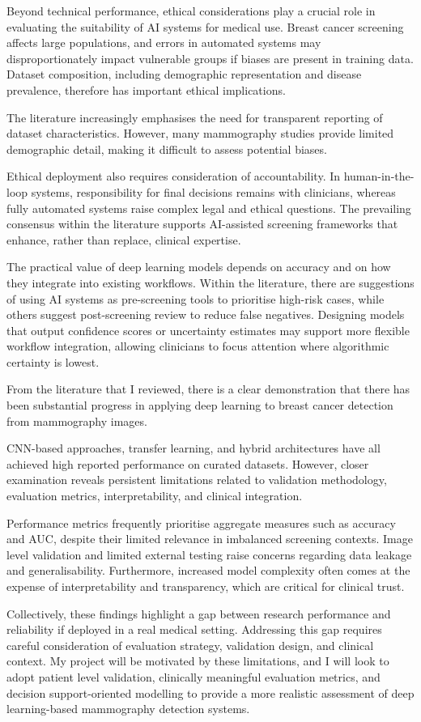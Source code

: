 Beyond technical performance, ethical considerations play a crucial role in evaluating the suitability of AI systems for medical use. Breast cancer screening affects large populations, and errors in automated systems may disproportionately impact vulnerable groups if biases are present in training data. Dataset composition, including demographic representation and disease prevalence, therefore has important ethical implications.

The literature increasingly emphasises the need for transparent reporting of dataset characteristics. However, many mammography studies provide limited demographic detail, making it difficult to assess potential biases.

Ethical deployment also requires consideration of accountability. In human-in-the-loop systems, responsibility for final decisions remains with clinicians, whereas fully automated systems raise complex legal and ethical questions. The prevailing consensus within the literature supports AI-assisted screening frameworks that enhance, rather than replace, clinical expertise.

The practical value of deep learning models depends on accuracy and on how they integrate into existing workflows. Within the literature, there are suggestions of using AI systems as pre-screening tools to prioritise high-risk cases, while others suggest post-screening review to reduce false negatives. Designing models that output confidence scores or uncertainty estimates may support more flexible workflow integration, allowing clinicians to focus attention where algorithmic certainty is lowest.

From the literature that I reviewed, there is a clear demonstration that there has been substantial progress in applying deep learning to breast cancer detection from mammography images. 

CNN-based approaches, transfer learning, and hybrid architectures have all achieved high reported performance on curated datasets. However, closer examination reveals persistent limitations related to validation methodology, evaluation metrics, interpretability, and clinical integration.

Performance metrics frequently prioritise aggregate measures such as accuracy and AUC, despite their limited relevance in imbalanced screening contexts. Image level validation and limited external testing raise concerns regarding data leakage and generalisability. Furthermore, increased model complexity often comes at the expense of interpretability and transparency, which are critical for clinical trust.

Collectively, these findings highlight a gap between research performance and reliability if deployed in a real medical setting. Addressing this gap requires careful consideration of evaluation strategy, validation design, and clinical context. My project will be motivated by these limitations, and I will look to adopt patient level validation, clinically meaningful evaluation metrics, and decision support-oriented modelling to provide a more realistic assessment of deep learning-based mammography detection systems.
